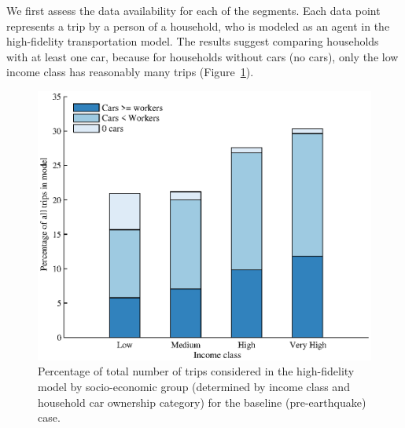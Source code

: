 We first assess the data availability for each of the segments. Each data point represents a trip by a person of a household, who is  modeled as an agent in the high-fidelity transportation model. The results suggest comparing households with at least one car, because for households without cars (no cars), only the low income class has reasonably many trips (Figure~\ref{fig:car}). 




\begin{figure}[h]
\centering
\includegraphics[width=6in]{FIGS/equity_dataset_count_bars.eps} 
\caption{Percentage of total number of trips considered in the high-fidelity model by socio-economic group (determined by income class and household car ownership category) for the baseline (pre-earthquake) case.}
\label{fig:car}
\end{figure}


 
